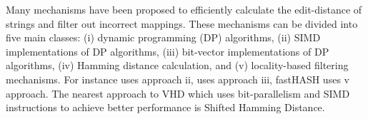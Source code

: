 Many mechanisms have been proposed to efficiently calculate the edit-distance of strings and filter out incorrect mappings. These mechanisms can be divided into five main classes: (i) dynamic programming (DP) algorithms, (ii) SIMD implementations of DP algorithms, (iii) bit-vector implementations of DP algorithms, (iv) Hamming distance calculation, and (v) locality-based filtering mechanisms. For instance \cite{swps3} uses approach ii, \cite{seqan} uses approach iii, fastHASH\cite{fasthash} uses v approach. The nearest approach to VHD which uses bit-parallelism and SIMD instructions to achieve better performance is Shifted Hamming Distance\cite{shd}.
  
  